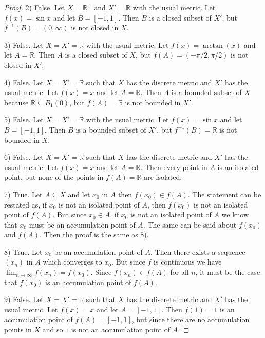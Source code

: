 \documentclass{article}
\begin{document}
\begin{flushleft}
\begin{proof}
2) False. Let $X = \mathbb{R}^+$ and $X' = \mathbb{R}$ with the usual metric. Let $f(x) = \sin x$ and let $B = [-1,1]$. Then $B$ is a closed subset of $X'$, but $f^{-1}(B) = (0, \infty)$ is not closed in $X$.\newline

3) False. Let $X = X' = \mathbb{R}$ with the usual metric. Let $f(x) = \arctan(x)$ and let $A = \mathbb{R}$. Then $A$ is a closed subset of $X$, but $f(A) = (-\pi/2, \pi/2)$ is not closed in $X'$.\newline

4) False. Let $X = X' = \mathbb{R}$ such that $X$ has the discrete metric and $X'$ has the usual metric. Let $f(x) = x$ and let $A = \mathbb{R}$. Then $A$ is a bounded subset of $X$ because $\mathbb{R} \subseteq B_1(0)$, but $f(A) = \mathbb{R}$ is not bounded in $X'$.\newline

5) False. Let $X = X' = \mathbb{R}$ with the usual metric. Let $f(x) = \sin x$ and let $B = [-1,1]$. Then $B$ is a bounded subset of $X'$, but $f^{-1}(B) = \mathbb{R}$ is not bounded in $X$.\newline

6) False. Let $X = X' = \mathbb{R}$ such that $X$ has the discrete metric and $X'$ has the usual metric. Let $f(x) = x$ and let $A = \mathbb{R}$. Then every point in $A$ is an isolated point, but none of the points in $f(A) = \mathbb{R}$ are isolated.\newline

7) True. Let $A \subseteq X$ and let $x_0$ in $A$ then $f(x_0) \in f(A)$. The statement can be restated as, if $x_0$ is not an isolated point of $A$, then $f(x_0)$ is not an isolated point of $f(A)$. But since $x_0 \in A$, if $x_0$ is not an isolated point of $A$ we know that $x_0$ must be an accumulation point of $A$. The same can be said about $f(x_0)$ and $f(A)$. Then the proof is the same as 8).\newline

8) True. Let $x_0$ be an accumulation point of $A$. Then there exists a sequence $(x_n)$ in $A$ which converges to $x_0$. But since $f$ is continuous we have $\lim_{n \rightarrow \infty} f(x_n) = f(x_0)$. Since $f(x_n) \in f(A)$ for all $n$, it must be the case that $f(x_0)$ is an accumulation point of $f(A)$.\newline

9) False. Let $X = X' = \mathbb{R}$ such that $X$ has the discrete metric and $X'$ has the usual metric. Let $f(x) = x$ and let $A = [-1,1]$. Then $f(1) = 1$ is an accumulation point of $f(A) = [-1,1]$, but since there are no accumulation points in $X$ and so $1$ is not an accumulation point of $A$.\newline


\end{proof}
\end{flushleft}
\end{document}
